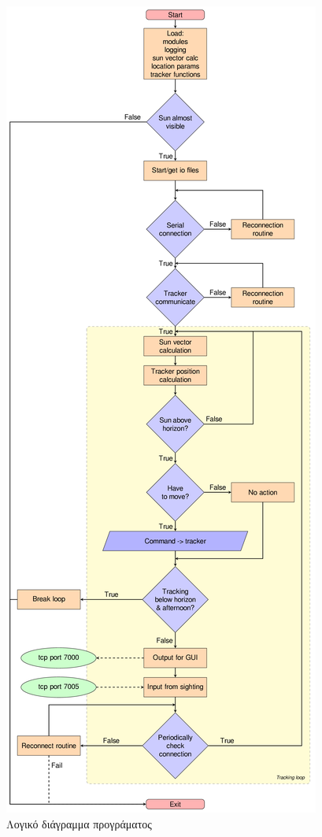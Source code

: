 \documentclass[
  a4paper,
  twoside,
  titlepage,
  11pt]{article}
\numberwithin{equation}{section}
\numberwithin{figure}{section}
\numberwithin{table}{section}
\begin{document}
\begin{figure}[H]

{\centering \includegraphics[width=0.9\linewidth,height=\textheight]{./figure/sun_tracker_main} 

}

\caption{Λογικό διάγραμμα προγράματος}\label{fig:unnamed-chunk-7}
\end{figure}
\end{document}
